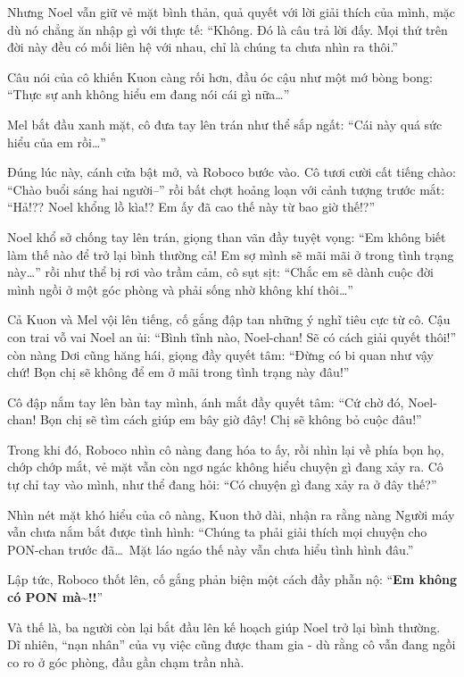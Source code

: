\documentclass[../main.tex]{subfiles}
\begin{document}
Nhưng Noel vẫn giữ vẻ mặt bình thản, quả quyết với lời giải thích của mình, mặc dù nó chẳng ăn nhập gì với thực tế: ``Không. Đó là câu trả lời đấy. Mọi thứ trên đời này đều có mối liên hệ với nhau, chỉ là chúng ta chưa nhìn ra thôi.''

Câu nói của cô khiến Kuon càng rối hơn, đầu óc cậu như một mớ bòng bong: ``Thực sự anh không hiểu em đang nói cái gì nữa\dots''

Mel bắt đầu xanh mặt, cô đưa tay lên trán như thể sắp ngất: ``Cái này quá sức hiểu của em rồi\dots''

Đúng lúc này, cánh cửa bật mở, và Roboco bước vào. Cô tươi cười cất tiếng chào: ``Chào buổi sáng hai người--'' rồi bất chợt hoảng loạn với cảnh tượng trước mắt: ``Hả!?? Noel khổng lồ kìa!? Em ấy đã cao thế này từ bao giờ thế!?''

Noel khổ sở chống tay lên trán, giọng than vãn đầy tuyệt vọng: ``Em không biết làm thế nào để trở lại bình thường cả! Em sợ mình sẽ mãi mãi ở trong tình trạng này\dots'' rồi như thể bị rơi vào trầm cảm, cô sụt sịt: ``Chắc em sẽ dành cuộc đời mình ngồi ở một góc phòng và phải sống nhờ không khí thôi\dots''


Cả Kuon và Mel vội lên tiếng, cố gắng đập tan những ý nghĩ tiêu cực từ cô. Cậu con trai vỗ vai Noel an ủi: ``Bình tĩnh nào, Noel-chan! Sẽ có cách giải quyết thôi!'' còn nàng Dơi cũng hăng hái, giọng đầy quyết tâm: ``Đừng có bi quan như vậy chứ! Bọn chị sẽ không để em ở mãi trong tình trạng này đâu!''

Cô đập nắm tay lên bàn tay mình, ánh mắt đầy quyết tâm: ``Cứ chờ đó, Noel-chan! Bọn chị sẽ tìm cách giúp em bây giờ đây! Chị sẽ không bỏ cuộc đâu!''

Trong khi đó, Roboco nhìn cô nàng đang hóa to ấy, rồi nhìn lại về phía bọn họ, chớp chớp mắt, vẻ mặt vẫn còn ngơ ngác không hiểu chuyện gì đang xảy ra. Cô tự chỉ tay vào mình, như thể đang hỏi: ``Có chuyện gì đang xảy ra ở đây thế?''

Nhìn nét mặt khó hiểu của cô nàng, Kuon thở dài, nhận ra rằng nàng Người máy vẫn chưa nắm bắt được tình hình: ``Chúng ta phải giải thích mọi chuyện cho PON-chan trước đã\dots\ Mặt láo ngáo thế này vẫn chưa hiểu tình hình đâu.''

Lập tức, Roboco thốt lên, cố gắng phản biện một cách đầy phẫn nộ: ``\textbf{Em không có PON mà\~{}!!}''

Và thế là, ba người còn lại bắt đầu lên kế hoạch giúp Noel trở lại bình thường. Dĩ nhiên, ``nạn nhân'' của vụ việc cũng được tham gia - dù rằng cô vẫn đang ngồi co ro ở góc phòng, đầu gần chạm trần nhà.
\end{document}
